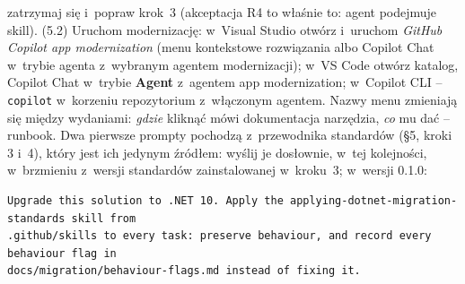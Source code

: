 \begin{enumerate}
    zatrzymaj się i~popraw krok~3 (akceptacja R4 to właśnie to: agent podejmuje skill). (5.2) Uruchom
    modernizację: w~Visual Studio otwórz  i~uruchom
    \emph{GitHub Copilot app modernization} (menu kontekstowe rozwiązania albo Copilot Chat
    w~trybie agenta z~wybranym agentem modernizacji); w~VS Code otwórz katalog, Copilot
    Chat w~trybie \textbf{Agent} z~agentem app modernization; w~Copilot CLI --
    \texttt{copilot} w~korzeniu repozytorium z~włączonym agentem. Nazwy menu zmieniają się
    między wydaniami: \emph{gdzie} kliknąć mówi dokumentacja narzędzia, \emph{co} mu dać --
    runbook. Dwa pierwsze prompty pochodzą z~przewodnika standardów (§5, kroki 3 i~4), który
    jest ich jedynym źródłem: wyślij je dosłownie, w~tej kolejności, w~brzmieniu z~wersji
    standardów zainstalowanej w~kroku~3; w~wersji 0.1.0:
\begin{lstlisting}
Upgrade this solution to .NET 10. Apply the applying-dotnet-migration-standards skill from
.github/skills to every task: preserve behaviour, and record every behaviour flag in
docs/migration/behaviour-flags.md instead of fixing it.


\end{lstlisting}
\end{enumerate}
